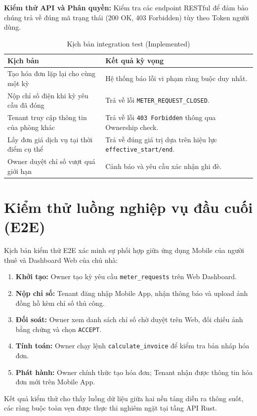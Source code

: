 \textbf{Kiểm thử API và Phân quyền:} Kiểm tra các endpoint RESTful để đảm bảo chúng trả về đúng mã trạng thái (200 OK, 403 Forbidden) tùy theo Token người dùng.

\begin{table}[htbp]
\centering
\caption{Kịch bản integration test (Implemented)}
\label{tab:integration-tests}
\begin{tabularx}{\textwidth}{l>{\raggedright\arraybackslash}X}
\toprule
\textbf{Kịch bản} & \textbf{Kết quả kỳ vọng} \\
\midrule
Tạo hóa đơn lặp lại cho cùng một kỳ & Hệ thống báo lỗi vi phạm ràng buộc duy nhất. \\
Nộp chỉ số điện khi kỳ yêu cầu đã đóng & Trả về lỗi \texttt{METER\_REQUEST\_CLOSED}. \\
Tenant truy cập thông tin của phòng khác & Trả về lỗi \texttt{403 Forbidden} thông qua Ownership check. \\
Lấy đơn giá dịch vụ tại thời điểm cụ thể & Trả về đúng giá trị dựa trên hiệu lực \texttt{effective\_start/end}. \\
Owner duyệt chỉ số vượt quá giới hạn & Cảnh báo và yêu cầu xác nhận ghi đè. \\
\bottomrule
\end{tabularx}
\end{table}

\section{Kiểm thử luồng nghiệp vụ đầu cuối (E2E)}

Kịch bản kiểm thử E2E xác minh sự phối hợp giữa ứng dụng Mobile của người thuê và Dashboard Web của chủ nhà:

\begin{enumerate}
  \item \textbf{Khởi tạo:} Owner tạo kỳ yêu cầu \texttt{meter\_requests} trên Web Dashboard.
  \item \textbf{Nộp chỉ số:} Tenant đăng nhập Mobile App, nhận thông báo và upload ảnh đồng hồ kèm chỉ số thủ công.
  \item \textbf{Đối soát:} Owner xem danh sách chỉ số chờ duyệt trên Web, đối chiếu ảnh bằng chứng và chọn \texttt{ACCEPT}.
  \item \textbf{Tính toán:} Owner chạy lệnh \texttt{calculate\_invoice} để kiểm tra bản nháp hóa đơn.
  \item \textbf{Phát hành:} Owner chính thức tạo hóa đơn; Tenant nhận được thông tin hóa đơn mới trên Mobile App.
\end{enumerate}

Kết quả kiểm thử cho thấy luồng dữ liệu giữa hai nền tảng diễn ra thông suốt, các ràng buộc toàn vẹn được thực thi nghiêm ngặt tại tầng API Rust.
